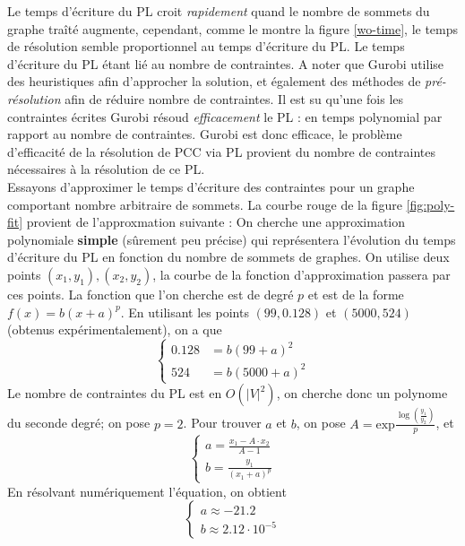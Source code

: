 \documentclass{article}
\begin{document}
Le temps d'écriture du PL croit \textit{rapidement} quand le nombre de sommets
du graphe traîté augmente, cependant, comme le montre la figure \ref{wo-time},
le temps de résolution semble proportionnel au temps d'écriture du PL. Le temps
d'écriture du PL étant lié au nombre de contraintes. A noter que Gurobi utilise
des heuristiques afin d'approcher la solution, et également des méthodes de
\textit{pré-résolution} afin de réduire nombre de contraintes. Il est su qu'une
fois les contraintes écrites Gurobi résoud \textit{efficacement} le PL : en
temps polynomial par rapport au nombre de contraintes. Gurobi est donc
efficace, le problème d'efficacité de la résolution de PCC via PL provient du
nombre de contraintes nécessaires à la résolution de ce PL. \\\noindent Essayons
d'approximer le temps d'écriture des contraintes pour un graphe comportant
nombre arbitraire de sommets. La courbe rouge de la figure \ref{fig:poly-fit}
provient de l'approxmation suivante : On cherche une approximation polynomiale
\textbf{simple} (sûrement peu précise) qui représentera l'évolution du temps
d'écriture du PL en fonction du nombre de sommets de graphes. On utilise deux
points $(x_1, y_1), (x_2, y_2)$, la courbe de la fonction d'approximation
passera par ces points. La fonction que l'on cherche est de degré $p$ et est de
la forme $f(x) = b(x+a)^p$. En utilisant les points $(99, 0.128)$ et $(5000,
524)$ (obtenus expérimentalement), on a que
\begin{equation}
    \begin{cases}
        0.128 & = b(99 + a)^2 \\
        524 & = b(5000 + a)^2
    \end{cases}
\end{equation}
Le nombre de contraintes du PL est en $O(|V|^2)$, on cherche donc un polynome du
seconde degré; on pose $p=2$. Pour trouver $a$ et $b$, on pose
$A=\text{exp}{\frac{{\log(\frac{y_1}{y_2})}}{p}}$, et
\begin{equation}
    \begin{cases}
        a = \frac{x_1 - A\cdot x_2}{A-1} \\
        b = \frac{y_1}{(x_1+a)^p}
    \end{cases}
\end{equation}
En résolvant numériquement l'équation, on obtient
\begin{equation}
    \begin{cases}
        a \approx -21.2 \\
        b \approx 2.12\cdot 10^{-5}
    \end{cases}
\end{equation}
\end{document}
